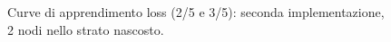 \documentclass[a4paper,12pt]{article}
\begin{document}
\begin{figure}[htp]
    \centering

    \medskip


    \caption{Curve di apprendimento loss (2/5 e 3/5): seconda implementazione, 2 nodi nello strato nascosto.}
    \label{fig4-2}
\end{figure}
\end{document}
